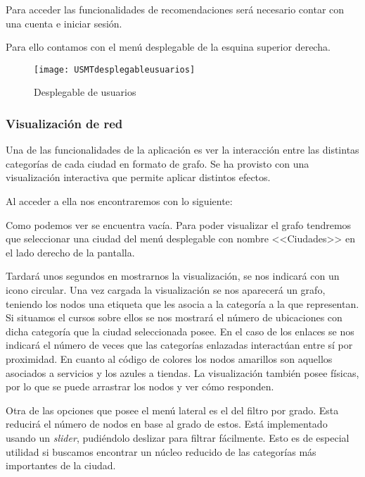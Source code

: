 Para acceder las funcionalidades de recomendaciones será necesario contar con una cuenta e iniciar sesión.

Para ello contamos con el menú desplegable de la esquina superior derecha.
\begin{figure}[h!]
	\centering
	\texttt{[image: USMTdesplegableusuarios]}\\
	\caption{Desplegable de usuarios}
\end{figure}


\subsubsection{Visualización de red}

Una de las funcionalidades de la aplicación es ver la interacción entre las distintas categorías de cada ciudad en formato de grafo. Se ha provisto con una visualización interactiva que permite aplicar distintos efectos.

Al acceder a ella nos encontraremos con lo siguiente:


Como podemos ver se encuentra vacía. Para poder visualizar el grafo tendremos que seleccionar una ciudad del menú desplegable con nombre <<Ciudades>> en el lado derecho de la pantalla.


Tardará unos segundos en mostrarnos la visualización, se nos indicará con un icono circular. Una vez cargada la visualización se nos aparecerá un grafo, teniendo los nodos una etiqueta que les asocia a la categoría a la que representan. Si situamos el cursos sobre ellos se nos mostrará el número de ubicaciones con dicha categoría que la ciudad seleccionada posee. En el caso de los enlaces se nos indicará el número de veces que las categorías enlazadas interactúan entre sí por proximidad. En cuanto al código de colores los nodos amarillos son aquellos asociados a servicios y los azules a tiendas. La visualización también posee físicas, por lo que se puede arrastrar los nodos y ver cómo responden.

Otra de las opciones que posee el menú lateral es el del filtro por grado. Esta reducirá el número de nodos en base al grado de estos. Está implementado usando un \textit{slider}, pudiéndolo deslizar para filtrar fácilmente. Esto es de especial utilidad si buscamos encontrar un núcleo reducido de las categorías más importantes de la ciudad.

